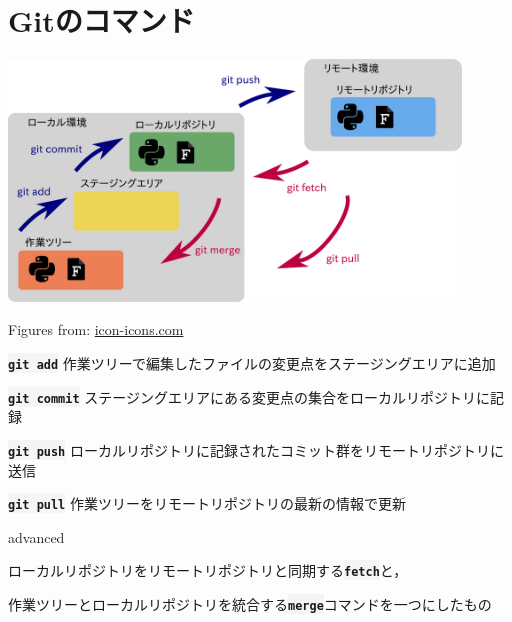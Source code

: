 \documentclass[12pt,dvipdfmx,svgnames,uplatex,aspectratio=169]{beamer}
\newcommand{\git}[1]{{\colorbox{WhiteSmoke}{\texttt{\textbf{#1}}}}}  %
\begin{document}
\section{Gitのコマンド}
\begin{frame}{\insertsection}
  \centering
  \includegraphics[bb=0.000000 0.000000 979.966736 524.329163, width=120mm]{./pics/git_structure_command.pdf}
  \begin{flushright}
    \scriptsize{Figures from: \href{https://icon-icons.com/ja/}{icon-icons.com}}
  \end{flushright}
\end{frame}

\begin{frame}{\insertsection}
  \begin{block}{\git{git add}}
    作業ツリーで編集したファイルの変更点をステージングエリアに追加
  \end{block}
  \begin{block}{\git{git commit}}
    ステージングエリアにある変更点の集合をローカルリポジトリに記録
  \end{block}
  \begin{block}{\git{git push}}
    ローカルリポジトリに記録されたコミット群をリモートリポジトリに送信
  \end{block}
  \begin{block}{\git{git pull}}
    作業ツリーをリモートリポジトリの最新の情報で更新

    \begin{beamercolorbox}[rounded=true]{advanced}
      \footnotesize{
        ローカルリポジトリをリモートリポジトリと同期する\git{fetch}と，

        作業ツリーとローカルリポジトリを統合する\git{merge}コマンドを一つにしたもの
      }
    \end{beamercolorbox}
  \end{block}
\end{frame}
\end{document}
